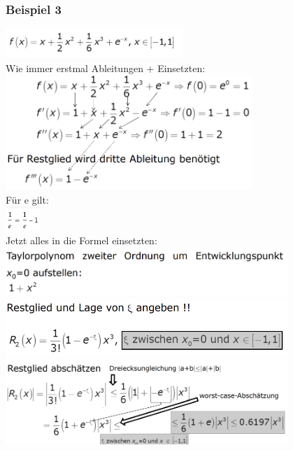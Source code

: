\documentclass[12pt,a4paper]{article}
\begin{document}
\subsubsection{Beispiel 3}
\includegraphics[width=0.5\textwidth]{BIlder/V1/29.png}\\
Wie immer erstmal Ableitungen + Einsetzten:\\
\includegraphics[width=0.7\textwidth]{BIlder/V1/30.png}\\
Für e gilt:\\
\includegraphics[width=0.1\textwidth]{BIlder/V1/31.png}\\
Jetzt alles in die Formel einsetzten:\\
\includegraphics[width=0.8\textwidth]{BIlder/V1/32.png}\\
\includegraphics[width=0.8\textwidth]{BIlder/V1/33.png}\\
\includegraphics[width=0.8\textwidth]{BIlder/V1/34.png}\\
\end{document}
